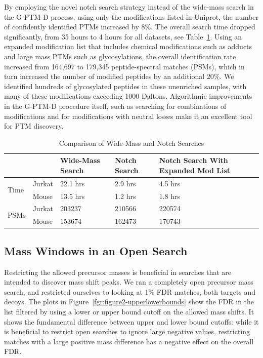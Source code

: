 \documentclass[journal=jprobs,manuscript=article]{achemso}
\begin{document}
By employing the novel notch search strategy instead of the wide-mass search in the G-PTM-D process, using only the modifications listed in Uniprot, the number of confidently identified PTMs increased by 8\%. The overall search time dropped significantly, from 35 hours to 4 hours for all datasets, see Table~\ref{my-label}. Using an expanded modification list that includes chemical modifications such as adducts and large mass PTMs such as glycosylations, the overall identification rate increased from 164,697 to 179,345 peptide-spectral matches (PSMs), which in turn increased the number of modified peptides by an additional 20\%. We identified hundreds of glycosylated peptides in these unenriched samples, with many of these modifications exceeding 1000 Daltons. Algorithmic improvements in the G-PTM-D procedure itself, such as searching for combinations of modifications and for modifications with neutral losses make it an excellent tool for PTM discovery.

\begin{table}[]
\centering
\caption{Comparison of Wide-Mass and Notch Searches}
\label{my-label}
\begin{tabular}{ll|l|l|l}
                      &        & Wide-Mass Search & Notch Search & Notch Search With Expanded Mod List \\
\hline
\multirow{2}{*}{Time} & Jurkat & 22.1 hrs         & 2.9 hrs   &  4.5 hrs  \\
                      & Mouse  & 13.5 hrs         & 1.2 hrs   &  1.8 hrs \\
\hline
\multirow{2}{*}{PSMs} & Jurkat & 203237           & 210566   &  220574  \\
                      & Mouse  & 153674           & 162473   &   170743
\end{tabular}
\end{table}


\subsection{Mass Windows in an Open Search}

Restricting the allowed precursor masses is beneficial in searches that are intended to discover mass shift peaks. We ran a completely open precursor mass search, and restricted ourselves to looking at 1\% FDR matches, both targets and decoys. The plots in Figure~\ref{fgr:figure2-upperlowerbounds} show the FDR in the list filtered by using a lower or upper bound cutoff on the allowed mass shifts. It shows the fundamental difference between upper and lower bound cutoffs: while it is beneficial to restrict open searches to ignore large negative values, restricting matches with a large positive mass difference has a negative effect on the overall FDR.
\end{document}
